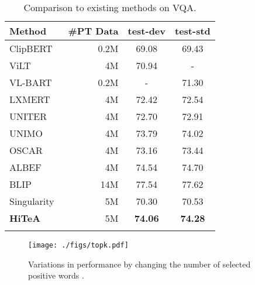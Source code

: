 \documentclass[10pt,twocolumn,letterpaper]{article}
\newlength\savewidth
\newcommand\shline{\noalign{\global\savewidth\arrayrulewidth\global\arrayrulewidth 1pt}\hline\noalign{\global\arrayrulewidth\savewidth}}
\newcommand{\tablestyle}[2]{\setlength{\tabcolsep}{#1}\renewcommand{\arraystretch}{#2}\centering\small}
\newcommand{\modelname}{\textbf{HiTeA}\xspace}
\begin{document}
 \begin{table}[t]
\vspace{1em}
\tablestyle{7pt}{1.05}
\begin{tabular}{lrcc}
\shline
Method & \#PT Data & test-dev & test-std \\
\hline
ClipBERT~\cite{lei2021clipbert} & 0.2M & 69.08 & 69.43 \\
ViLT~\cite{kim2021vilt} & 4M & 70.94 & - \\
VL-BART~\cite{cho2021unifying} & 0.2M & - & 71.30 \\
LXMERT~\cite{tan2019lxmert} & 4M & 72.42 & 72.54 \\
UNITER~\cite{chen2020uniter} & 4M & 72.70 & 72.91 \\
UNIMO~\cite{li2020unimo} & 4M & 73.79 & 74.02 \\
OSCAR~\cite{li2020oscar} & 4M & 73.16 & 73.44 \\
ALBEF~\cite{li2021align} & 4M & 74.54 & 74.70 \\
BLIP~\cite{li2022blip} & 14M & 77.54 & 77.62 \\
Singularity~\cite{lei2022singularity} & 5M & 70.30 & 70.53 \\
\hline
\modelname & 5M & \textbf{74.06} & \textbf{74.28} \\
\shline
\end{tabular}
\caption{Comparison to existing methods on VQA.}
\label{tab:img_vqa}
\vspace{-2ex}
\end{table} 

\begin{figure*}
    \centering
    \texttt{[image: ./figs/topk.pdf]}
    \caption{Variations in performance by changing the number of selected positive words .}
\label{fig:topk}
\end{figure*}
\end{document}
